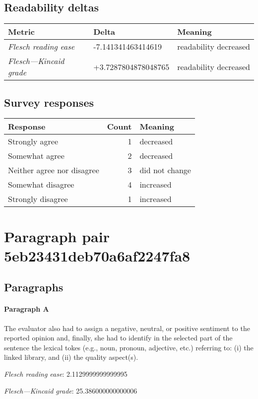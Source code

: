 \subsection{Readability deltas}

\begin{tabular}{lll}
\toprule
               \textbf{Metric} &       \textbf{Delta} &       \textbf{Meaning} \\
\midrule
    \emph{Flesch reading ease} &   -7.141341463414619 &  readability decreased \\
 \emph{Flesch---Kincaid grade} &  +3.7287804878048765 &  readability decreased \\
\bottomrule
\end{tabular}

\subsection{Survey responses}
\begin{tabular}{lrl}
\toprule
          \textbf{Response} &  \textbf{Count} & \textbf{Meaning} \\
\midrule
             Strongly agree &               1 &        decreased \\
             Somewhat agree &               2 &        decreased \\
 Neither agree nor disagree &               3 &   did not change \\
          Somewhat disagree &               4 &        increased \\
          Strongly disagree &               1 &        increased \\
\bottomrule
\end{tabular}

\section{Paragraph pair 5eb23431deb70a6af2247fa8}
\subsection{Paragraphs}
\paragraph{Paragraph A}
The evaluator also had to assign a negative, neutral, or positive sentiment to the reported opinion and, finally, she had to identify in the selected part of the sentence the lexical tokes (e.g., noun, pronoun, adjective, etc.) referring to: (i) the linked library, and (ii) the quality aspect(s).\par\medskip\emph{Flesch reading ease}: 2.1129999999999995\par\emph{Flesch---Kincaid grade}: 25.386000000000006

